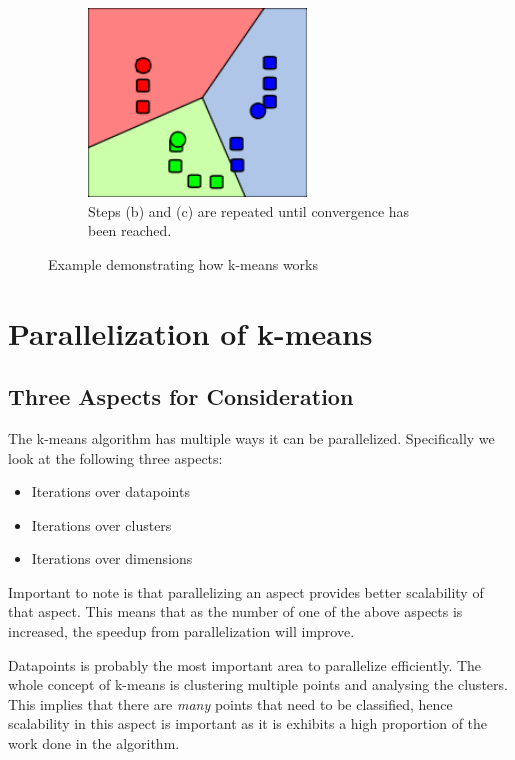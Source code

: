 \documentclass{article}
\begin{document}
\begin{figure}
    \begin{subfigure}{0.5\textwidth}
        \includegraphics[width=0.9\linewidth, height=5cm]{Pictures/K_Means_Example_Step_4.png}
        \caption{Steps (b) and (c) are repeated until convergence has been reached.}
    \end{subfigure}
\caption{Example demonstrating how k-means works} \citep{wikikmeans}


\end{figure}



\section{Parallelization of k-means}
\subsection{Three Aspects for Consideration}
The k-means algorithm has multiple ways it can be parallelized. Specifically we look at the following three aspects:
\begin{itemize}
	\item Iterations over datapoints
	\item Iterations over clusters
	\item Iterations over dimensions
\end{itemize}

Important to note is that parallelizing an aspect provides better scalability of that aspect. This means that as the number of one of the above aspects is increased, the speedup from parallelization will improve.

Datapoints is probably the most important area to parallelize efficiently. The whole concept of k-means is clustering multiple points and analysing the clusters. This implies that there are \emph{many} points that need to be classified, hence scalability in this aspect is important as it is exhibits a high proportion of the work done in the algorithm.
\end{document}
